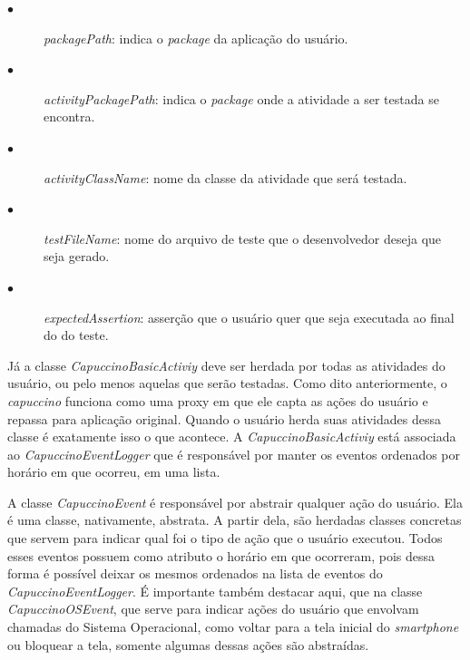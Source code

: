 \documentclass[
    12pt,       %
    openright,      %
    twoside,      %
    a4paper,      %
    english,      %
    french,       %
    spanish,      %
    brazil,       %
    ]{abntex2}
\begin{document}
          \begin{description}
            \item[$\bullet$] \textit{packagePath}: indica o \textit{package} da aplicação do usuário.
            \item[$\bullet$] \textit{activityPackagePath}: indica o \textit{package} onde a atividade a
                                                           ser testada se encontra.

            \item[$\bullet$] \textit{activityClassName}: nome da classe da atividade que será testada.
            \item[$\bullet$] \textit{testFileName}: nome do arquivo de teste que o desenvolvedor deseja que seja
                                                    gerado.

            \item[$\bullet$] \textit{expectedAssertion}:  asserção que o usuário quer que seja executada ao final do
                                                          do teste.
          \end{description}

          Já a classe \textit{CapuccinoBasicActiviy} deve ser herdada por todas as atividades do usuário,
          ou pelo menos aquelas que serão testadas. Como dito anteriormente, o \textit{capuccino} funciona
          como uma proxy em que ele capta as ações do usuário e repassa para aplicação original. Quando
          o usuário herda suas atividades dessa classe é exatamente isso o que acontece. A
          \textit{CapuccinoBasicActiviy} está associada ao \textit{CapuccinoEventLogger} que é responsável
          por manter os eventos ordenados por horário em que ocorreu, em uma lista.

          A classe \textit{CapuccinoEvent} é responsável por abstrair qualquer ação do usuário. Ela é uma
          classe, nativamente, abstrata. A partir dela, são herdadas classes concretas que servem para indicar
          qual foi o tipo de ação que o usuário executou. Todos esses eventos possuem como atributo o horário
          em que ocorreram, pois dessa forma é possível deixar os mesmos ordenados na lista de eventos do
          \textit{CapuccinoEventLogger}. É importante também destacar aqui, que na classe \textit{CapuccinoOSEvent},
          que serve para indicar ações do usuário que envolvam chamadas do Sistema Operacional, como voltar
          para a tela inicial do \textit{smartphone} ou bloquear a tela, somente algumas dessas ações são
          abstraídas.
\end{document}
